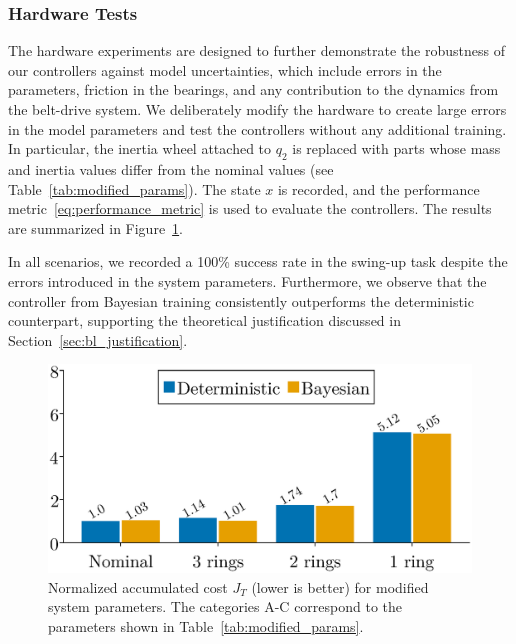 \subsubsection{Hardware Tests} 

The hardware experiments are designed to further demonstrate the robustness of our
controllers against model uncertainties, which include errors in the parameters,
friction in the bearings, and any contribution to the dynamics from the
belt-drive system.
%
We deliberately modify the hardware to create large errors in the model
parameters and test the controllers without any additional training.
%
In particular, the inertia wheel attached to $q_2$ is replaced with parts whose
mass and inertia values differ from the nominal values (see
Table~\ref{tab:modified_params}). The state $x$ is recorded, and the performance
metric~\eqref{eq:performance_metric} is used to evaluate the controllers.
%
The results are summarized in Figure~\ref{fig:neuralidapbc_bar_plot}.

In all scenarios, we recorded a 100\% success rate in the swing-up task despite
the errors introduced in the system parameters.
%
Furthermore, we observe that the controller from Bayesian training consistently
outperforms the deterministic counterpart, supporting the
theoretical justification discussed in Section~\ref{sec:bl_justification}. 
\begin{figure}[H]
    \centering
    \includegraphics[width=0.7\linewidth]{./figures/idapbc_bar.eps}
    \caption{
        Normalized accumulated cost $J_{T}$ (lower is better) for
        modified system parameters.
        The categories A-C correspond to the parameters shown in
        Table~\ref{tab:modified_params}.
    }
    \label{fig:neuralidapbc_bar_plot}
\end{figure}
%

